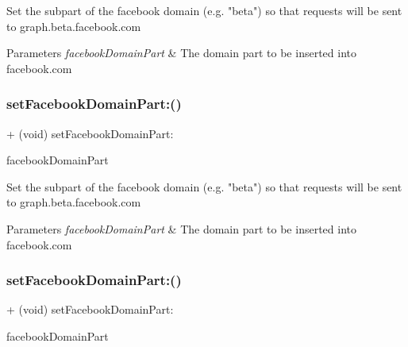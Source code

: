 Set the subpart of the facebook domain (e.\+g. "beta") so that requests will be sent to graph.\+beta.\+facebook.\+com


\begin{DoxyParams}{Parameters}
{\em facebook\+Domain\+Part} & The domain part to be inserted into facebook.\+com \\
\hline
\end{DoxyParams}
\mbox{\label{interfaceFBSettings_a4cfd61825c72f8a5978cb07ba84983d1}} 
\subsubsection{\texorpdfstring{set\+Facebook\+Domain\+Part\+:()}{setFacebookDomainPart:()}\hspace{0.1cm}{\footnotesize\ttfamily [4/5]}}
{\footnotesize\ttfamily + (void) set\+Facebook\+Domain\+Part\+: \begin{DoxyParamCaption}\item[{(N\+S\+String $\ast$)}]{facebook\+Domain\+Part }\end{DoxyParamCaption}}

Set the subpart of the facebook domain (e.\+g. "beta") so that requests will be sent to graph.\+beta.\+facebook.\+com


\begin{DoxyParams}{Parameters}
{\em facebook\+Domain\+Part} & The domain part to be inserted into facebook.\+com \\
\hline
\end{DoxyParams}
\mbox{\label{interfaceFBSettings_a4cfd61825c72f8a5978cb07ba84983d1}} 
\subsubsection{\texorpdfstring{set\+Facebook\+Domain\+Part\+:()}{setFacebookDomainPart:()}\hspace{0.1cm}{\footnotesize\ttfamily [5/5]}}
{\footnotesize\ttfamily + (void) set\+Facebook\+Domain\+Part\+: \begin{DoxyParamCaption}\item[{(N\+S\+String $\ast$)}]{facebook\+Domain\+Part }\end{DoxyParamCaption}}

